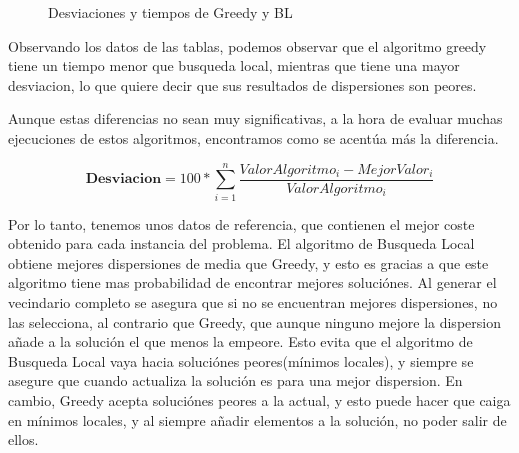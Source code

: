\documentclass{article}
\begin{document}
\begin{figure}[h]
	\centering
	\caption{Desviaciones y tiempos de Greedy y BL}
\end{figure}

\vspace{10mm}
Observando los datos de las tablas, podemos observar que el algoritmo greedy tiene un
tiempo menor que busqueda local, mientras que tiene una mayor desviacion, lo que quiere decir
que sus resultados de dispersiones son peores.
\vspace{10mm}

Aunque estas diferencias no sean muy significativas, a la hora de evaluar muchas ejecuciones
de estos algoritmos, encontramos como se acentúa más la diferencia.
\vspace{5mm}

\vspace{10mm}
\begin{equation}
	\textbf{Desviacion} =
	100*\sum_{i=1}^n
	\frac{ValorAlgoritmo_i - MejorValor_i}{ValorAlgoritmo_i}
\end{equation}

\vspace{10mm}
Por lo tanto, tenemos unos datos de referencia, que contienen el mejor coste obtenido para
cada instancia del problema.
El algoritmo de Busqueda Local obtiene mejores dispersiones de media que Greedy, y esto es gracias a que
este algoritmo tiene mas probabilidad de encontrar mejores soluciónes.
\newline Al generar el vecindario completo se asegura que si no se encuentran mejores
dispersiones, no las selecciona, al contrario que Greedy, que aunque ninguno mejore la dispersion
añade a la solución el que menos la empeore.
\newline Esto evita que el algoritmo de Busqueda Local vaya hacia soluciónes peores(mínimos locales), y siempre
se asegure que cuando actualiza la solución es para una mejor dispersion.
\newpage En cambio, Greedy acepta soluciónes peores a la actual, y esto puede hacer que caiga en mínimos locales,
y al siempre añadir elementos a la solución, no poder salir de ellos.
\end{document}
